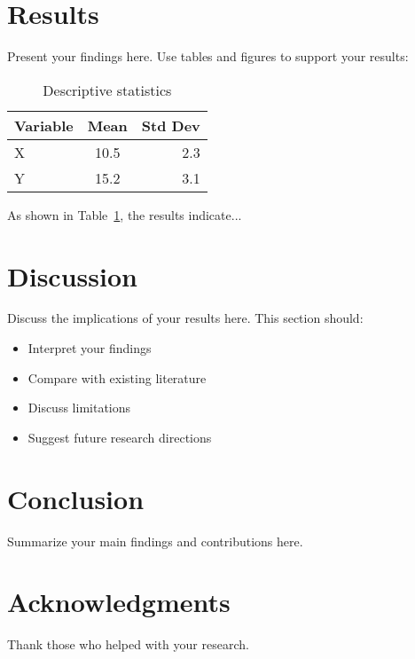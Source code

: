 \documentclass[11pt]{article}
\begin{document}
\section{Results}
Present your findings here. Use tables and figures to support your results:

\begin{table}[h]
\centering
\begin{tabular}{|l|c|r|}
\hline
Variable & Mean & Std Dev \\
\hline
X & 10.5 & 2.3 \\
Y & 15.2 & 3.1 \\
\hline
\end{tabular}
\caption{Descriptive statistics}
\label{tab:stats}
\end{table}

As shown in Table~\ref{tab:stats}, the results indicate...

\section{Discussion}
Discuss the implications of your results here. This section should:
\begin{itemize}
    \item Interpret your findings
    \item Compare with existing literature
    \item Discuss limitations
    \item Suggest future research directions
\end{itemize}

\section{Conclusion}
Summarize your main findings and contributions here.

\section*{Acknowledgments}
Thank those who helped with your research.

\printbibliography
\end{document}
